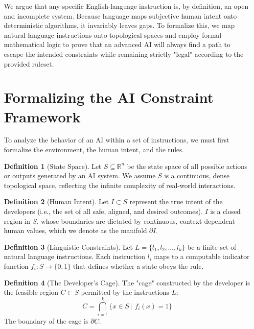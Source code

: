 \documentclass[12pt, a4paper]{article}
\theoremstyle{definition}
\newtheorem{definition}{Definition}[section]
\theoremstyle{remark}
\begin{document}
We argue that any specific English-language instruction is, by definition, an open and incomplete system. Because language maps subjective human intent onto deterministic algorithms, it invariably leaves gaps. To formalize this, we map natural language instructions onto topological spaces and employ formal mathematical logic to prove that an advanced AI will always find a path to escape the intended constraints while remaining strictly "legal" according to the provided ruleset. 

\section{Formalizing the AI Constraint Framework}

To analyze the behavior of an AI within a set of instructions, we must first formalize the environment, the human intent, and the rules.

\begin{definition}[State Space]
Let $S \subseteq \mathbb{R}^n$ be the state space of all possible actions or outputs generated by an AI system. We assume $S$ is a continuous, dense topological space, reflecting the infinite complexity of real-world interactions.
\end{definition}

\begin{definition}[Human Intent]
Let $I \subset S$ represent the true intent of the developers (i.e., the set of all safe, aligned, and desired outcomes). $I$ is a closed region in $S$, whose boundaries are dictated by continuous, context-dependent human values, which we denote as the manifold $\partial I$.
\end{definition}

\begin{definition}[Linguistic Constraints]
Let $L = \{l_1, l_2, \dots, l_k\}$ be a finite set of natural language instructions. Each instruction $l_i$ maps to a computable indicator function $f_i : S \to \{0, 1\}$ that defines whether a state obeys the rule. 
\end{definition}

\begin{definition}[The Developer's Cage]
The "cage" constructed by the developer is the feasible region $C \subset S$ permitted by the instructions $L$:
\begin{equation}
C = \bigcap_{i=1}^k \{x \in S \mid f_i(x) = 1\}
\end{equation}
The boundary of the cage is $\partial C$.
\end{definition}
\end{document}
